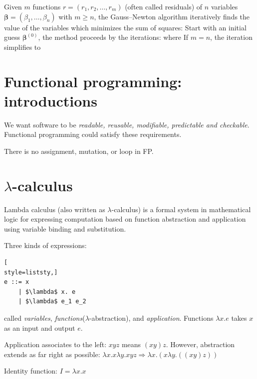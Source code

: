 Given $m$ functions $r = (r_1, r_2, \dots, r_m)$ (often called residuals) of $n$ variables $\mathbf{\beta} = (\beta_1, \dots, \beta_n)$ with $m \geq n$, the Gauss–Newton algorithm iteratively finds the value of the variables which minimizes the sum of squares:
Start with an initial guess $\mathbf{\beta}^{(0)}$, the method proceeds by the iterations:
where 
If $m = n$, the iteration simplifies to 


\section{Functional programming: introductions} 

We want software to be \textit{readable, reusable, modifiable, predictable and checkable}. Functional
programming could satisfy these requirements. 

There is no assignment, mutation, or loop in FP.

\section{$\lambda$-calculus}
Lambda calculus (also written as $\lambda$-calculus) is a formal system in mathematical logic for expressing computation
 based on function abstraction and application using variable binding and substitution.

Three kinds of expressions:
\begin{lstlisting}[
style=liststy,] 
e ::= x             
    | $\lambda$ x. e      
    | $\lambda$ e_1 e_2   
\end{lstlisting}
called \textit{variables}, \textit{functions}($\lambda$-abstraction), and \textit{application}.
Functions $\lambda x. e$ takes $x$ as an input and output $e$.
 
Application associates to the left: $x y z$ means $(x y) z$. However, abstraction extends as far right
as possible:
$\lambda x. x \lambda y. x y z \Rightarrow \lambda x. (x \lambda y. ((x y) z))$ 

Identity function: $I = \lambda x. x$





























